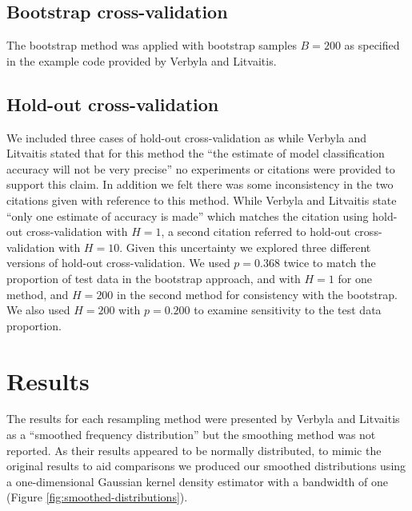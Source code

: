 \subsection{Bootstrap cross-validation}

The bootstrap method was applied with bootstrap samples $B=200$ as
specified in the example code provided by Verbyla and Litvaitis\supercite{verbyla-1989}.

\subsection{Hold-out cross-validation}

We included three cases of hold-out cross-validation as while Verbyla and Litvaitis\supercite{verbyla-1989} 
stated that for this method the ``the estimate
of model classification accuracy will not be very precise'' no
experiments or citations were provided to support this claim. In
addition we felt there was some inconsistency in the two citations given with
reference to this method.  While Verbyla and Litvaitis\supercite{verbyla-1989} state 
``only one estimate of accuracy 
is made'' which matches the citation\supercite{lachenbruch-1968} using hold-out cross-validation
with $H=1$, a second citation\supercite{capen-1986} referred to hold-out
cross-validation with $H=10$.  Given this uncertainty we
explored three different versions of hold-out cross-validation. We used
$p=0.368$ twice to match the proportion of test data in the bootstrap
approach, and with $H=1$ for one method, and $H=200$ in the second
method for consistency with the bootstrap. We also used $H=200$ with
$p=0.200$ to examine sensitivity to the test data proportion.

\section{Results}

The results for each resampling method were presented by Verbyla and Litvaitis\supercite{verbyla-1989} 
as a ``smoothed frequency distribution'' but the
smoothing method was not reported. As their results appeared to be
normally distributed, to mimic the original results to aid comparisons
we produced our smoothed distributions using a one-dimensional Gaussian
kernel density estimator with a bandwidth of one (Figure \ref{fig:smoothed-distributions}).

